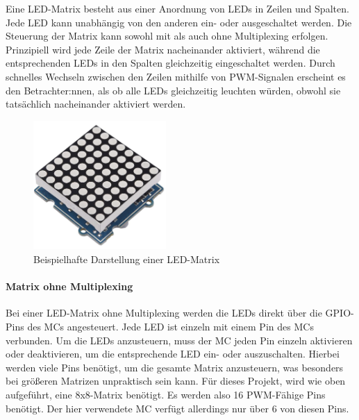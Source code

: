 Eine LED-Matrix besteht aus einer Anordnung von LEDs in Zeilen und Spalten.
Jede LED kann unabhängig von den anderen ein- oder ausgeschaltet werden.
Die Steuerung der Matrix kann sowohl mit als auch ohne Multiplexing erfolgen.
Prinzipiell wird jede Zeile der Matrix nacheinander aktiviert, während die
entsprechenden LEDs in den Spalten gleichzeitig eingeschaltet werden.
Durch schnelles Wechseln zwischen den Zeilen mithilfe von \ac{PWM}-Signalen erscheint es den Betrachter:nnen, als ob alle LEDs
gleichzeitig leuchten würden, obwohl sie tatsächlich nacheinander aktiviert werden.

\begin{figure}[htbp]
	\centering
	\includegraphics[width=0.45\textwidth]{img/LED-Matrix}
	\caption{Beispielhafte Darstellung einer LED-Matrix}
	\label{img:LED-Matrix}
\end{figure}

\paragraph{Matrix ohne Multiplexing}

Bei einer LED-Matrix ohne Multiplexing werden die LEDs direkt über die \ac{GPIO}-Pins des
\ac{MC}s angesteuert. Jede LED ist einzeln mit einem Pin des \ac{MC}s verbunden. Um die LEDs anzusteuern,
muss der \ac{MC} jeden Pin einzeln aktivieren oder deaktivieren, um die entsprechende LED ein- oder auszuschalten.
Hierbei werden viele Pins benötigt, um die gesamte Matrix anzusteuern, was besonders bei größeren Matrizen unpraktisch
sein kann. Für dieses Projekt, wird wie oben aufgeführt, eine 8x8-Matrix benötigt. Es werden also 16 PWM-Fähige Pins
benötigt. Der hier verwendete \ac{MC} verfügt allerdings nur über 6 von diesen Pins.

